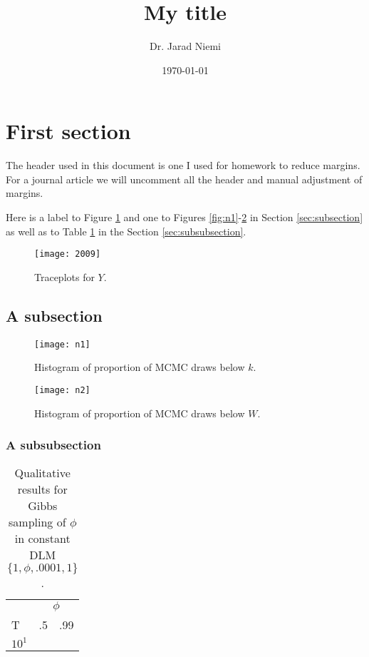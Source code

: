 \documentclass[10pt]{article}
\title{My title}
\author{Dr. Jarad Niemi}
\date{\today}
\begin{document}
\maketitle
\newpage

\section{First section}

The header used in this document is one I used for homework to reduce margins. For a journal article we will uncomment all the header and manual adjustment of margins.

Here is a label to Figure \ref{fig:2009} and one to Figures \ref{fig:n1}-\ref{fig:n2} in Section \ref{sec:subsection} as well as to Table \ref{20070717t1} in the Section \ref{sec:subsubsection}. 

\begin{figure}[htbp]
\centering
\texttt{[image: 2009]}
\begin{minipage}{.85\textwidth}
\caption{Traceplots for $Y$.}
\label{fig:2009}
\end{minipage}
\end{figure}

\subsection{A subsection \label{sec:subsection}}

\begin{figure}
\begin{minipage}[b]{0.5\linewidth} %
\centering
\texttt{[image: n1]}
\caption{Histogram of proportion of MCMC draws below $k$.}\label{fig:n1}
\end{minipage}
\hspace{0.5cm} %
\begin{minipage}[b]{0.5\linewidth}
\centering
\texttt{[image: n2]}
\caption{Histogram of proportion of MCMC draws below $W$.}\label{fig:n2}
\end{minipage}
\end{figure}

\subsubsection{A subsubsection \label{sec:subsubsection}}

\begin{table}[htbp]
\centering
\caption{Qualitative results for Gibbs sampling of $\phi$ in constant DLM $\{1,\phi, .0001,1\}$.}
\label{20070717t1}
\vspace{11pt}
\begin{tabular}{l|cc}
\hline
& \multicolumn{2}{c}{$\phi$} \\
T & .5 & .99 \\
\hline
$10^1$ & \\

\hline
\end{tabular}
\end{table}
\end{document}
